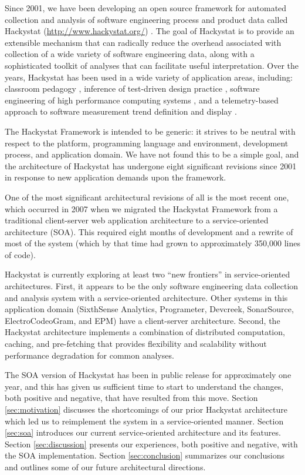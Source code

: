 \documentclass[conference,compsoc,peerreview]{IEEEtran}
\begin{document}
Since 2001, we have been developing an open source framework for automated
collection and analysis of software engineering process and product data
called Hackystat (\url{http://www.hackystat.org/})
\cite{csdl2-06-06,csdl2-02-07}.  The goal of Hackystat is to provide an
extensible mechanism that can radically reduce the overhead associated with
collection of a wide variety of software engineering data, along with a
sophisticated toolkit of analyses that can facilitate useful
interpretation.  Over the years, Hackystat has been used in a wide variety
of application areas, including: classroom pedagogy \cite{csdl2-03-12},
inference of test-driven design practice \cite{csdl2-06-13}, software
engineering of high performance computing systems \cite{csdl2-06-08}, and a
telemetry-based approach to software measurement trend definition and
display \cite{csdl2-04-11}.

The Hackystat Framework is intended to be generic: it strives to be neutral
with respect to the platform, programming language and environment,
development process, and application domain.  We have not found this to be
a simple goal, and the architecture of Hackystat has undergone eight
significant revisions since 2001 in response to new application demands
upon the framework.

One of the most significant architectural revisions of all is the most
recent one, which occurred in 2007 when we migrated the Hackystat Framework
from a traditional client-server web application architecture to a
service-oriented architecture (SOA).  This required eight months of
development and a rewrite of most of the system (which by that time had
grown to approximately 350,000 lines of code).  

Hackystat is currently exploring at least two ``new frontiers'' in
service-oriented architectures. First, it appears to be the only software
engineering data collection and analysis system with a service-oriented
architecture.  Other systems in this application domain (SixthSense
Analytics, Programeter, Devcreek, SonarSource, ElectroCodeoGram, and EPM)
have a client-server architecture.  Second, the Hackystat architecture
implements a combination of distributed computation, caching, and
pre-fetching that provides flexibility and scalability without performance
degradation for common analyses.

The SOA version of Hackystat has been in public release for approximately
one year, and this has given us sufficient time to start to understand the
changes, both positive and negative, that have resulted from this move.
Section \ref{sec:motivation} discusses the shortcomings of our prior
Hackystat architecture which led us to reimplement the system in a
service-oriented manner.  Section \ref{sec:soa} introduces our current
service-oriented architecture and its features.  Section
\ref{sec:discussion} presents our experiences, both positive and negative,
with the SOA implementation.  Section \ref{sec:conclusion} summarizes our
conclusions and outlines some of our future architectural directions.
\end{document}
